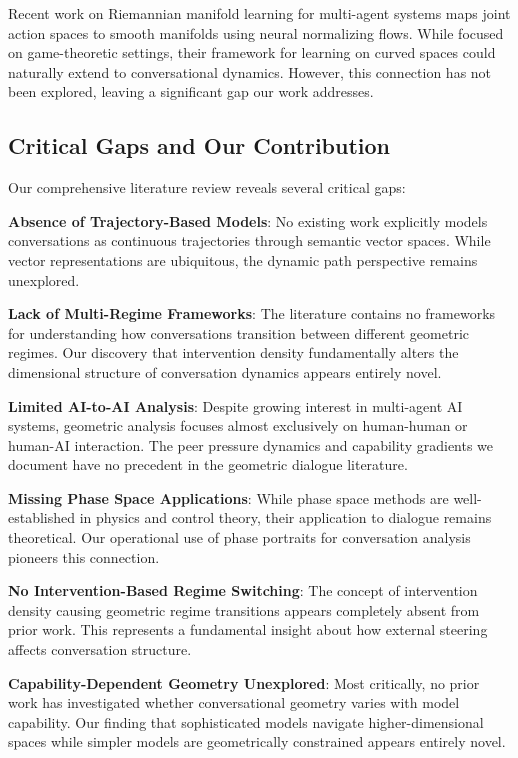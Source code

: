 \documentclass[11pt,letterpaper]{article}
\begin{document}
Recent work on Riemannian manifold learning for multi-agent systems \citep{liu2025riemannian} maps joint action spaces to smooth manifolds using neural normalizing flows. While focused on game-theoretic settings, their framework for learning on curved spaces could naturally extend to conversational dynamics. However, this connection has not been explored, leaving a significant gap our work addresses.

\subsection{Critical Gaps and Our Contribution}

Our comprehensive literature review reveals several critical gaps:

\textbf{Absence of Trajectory-Based Models}: No existing work explicitly models conversations as continuous trajectories through semantic vector spaces. While vector representations are ubiquitous, the dynamic path perspective remains unexplored.

\textbf{Lack of Multi-Regime Frameworks}: The literature contains no frameworks for understanding how conversations transition between different geometric regimes. Our discovery that intervention density fundamentally alters the dimensional structure of conversation dynamics appears entirely novel.

\textbf{Limited AI-to-AI Analysis}: Despite growing interest in multi-agent AI systems, geometric analysis focuses almost exclusively on human-human or human-AI interaction. The peer pressure dynamics and capability gradients we document have no precedent in the geometric dialogue literature.

\textbf{Missing Phase Space Applications}: While phase space methods are well-established in physics and control theory, their application to dialogue remains theoretical. Our operational use of phase portraits for conversation analysis pioneers this connection.

\textbf{No Intervention-Based Regime Switching}: The concept of intervention density causing geometric regime transitions appears completely absent from prior work. This represents a fundamental insight about how external steering affects conversation structure.

\textbf{Capability-Dependent Geometry Unexplored}: Most critically, no prior work has investigated whether conversational geometry varies with model capability. Our finding that sophisticated models navigate higher-dimensional spaces while simpler models are geometrically constrained appears entirely novel.
\end{document}
